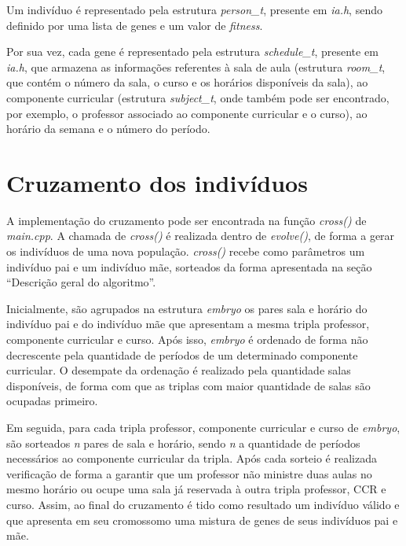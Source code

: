 \documentclass[12pt]{article}
\begin{document}
Um indivíduo é representado pela estrutura \emph{person\_t}, presente em \emph{ia.h}, sendo definido por uma lista de genes e um valor de \textit{fitness}.

Por sua vez, cada gene é representado pela estrutura \emph{schedule\_t}, presente em \emph{ia.h}, que armazena as informações referentes à sala de aula (estrutura \emph{room\_t}, que contém o número da sala, o curso e os horários disponíveis da sala), ao componente curricular (estrutura \emph{subject\_t}, onde também pode ser encontrado, por exemplo, o professor associado ao componente curricular e o curso), ao horário da semana e o número do período.

\section{Cruzamento dos indivíduos}

A implementação do cruzamento pode ser encontrada na função \emph{cross()} de \emph{main.cpp}. A chamada de \emph{cross()} é realizada dentro de \emph{evolve()}, de forma a gerar os indivíduos de uma nova população. \emph{cross()} recebe como parâmetros um indivíduo pai e um indivíduo mãe, sorteados da forma apresentada na seção ``Descrição geral do algoritmo''.

Inicialmente, são agrupados na estrutura \emph{embryo} os pares sala e horário do indivíduo pai e do indivíduo mãe que apresentam a mesma tripla professor, componente curricular e curso. Após isso, \emph{embryo} é ordenado de forma não decrescente pela quantidade de períodos de um determinado componente curricular. O desempate da ordenação é realizado pela quantidade salas disponíveis, de forma com que as triplas com maior quantidade de salas são ocupadas primeiro.

Em seguida, para cada tripla professor, componente curricular e curso de \emph{embryo}, são sorteados \textit{n} pares de sala e horário, sendo \textit{n} a quantidade de períodos necessários ao componente curricular da tripla. Após cada sorteio é realizada verificação de forma a garantir que um professor não ministre duas aulas no mesmo horário ou ocupe uma sala já reservada à outra tripla professor, CCR e curso. Assim, ao final do cruzamento é tido como resultado um indivíduo válido e que apresenta em seu cromossomo uma mistura de genes de seus indivíduos pai e mãe.
\end{document}
